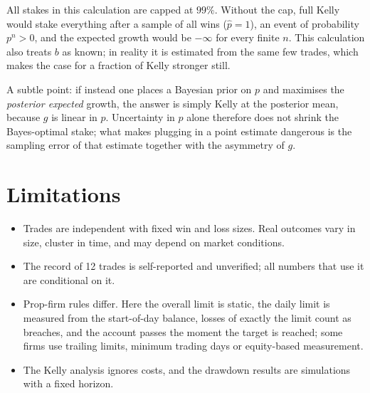 \documentclass[11pt,a4paper]{article}
\begin{document}
All stakes in this calculation are capped at $99\%$. Without the cap, full Kelly would
stake everything after a sample of all wins ($\hat p = 1$), an event of probability
$p^n > 0$, and the expected growth would be $-\infty$ for every finite $n$. This calculation also
treats $b$ as known; in reality it is estimated from the same few trades, which makes
the case for a fraction of Kelly stronger still.

A subtle point: if instead one places a Bayesian prior on $p$ and maximises the
\emph{posterior expected} growth, the answer is simply Kelly at the posterior mean,
because $g$ is linear in $p$. Uncertainty in $p$ alone therefore does not shrink the
Bayes-optimal stake; what makes plugging in a point estimate dangerous is the sampling
error of that estimate together with the asymmetry of $g$.

\section{Limitations}

\begin{itemize}
\item Trades are independent with fixed win and loss sizes. Real outcomes vary in size,
cluster in time, and may depend on market conditions.
\item The record of 12 trades is self-reported and unverified; all numbers that use it
are conditional on it.
\item Prop-firm rules differ. Here the overall limit is static, the daily limit is
measured from the start-of-day balance, losses of exactly the limit count as breaches,
and the account passes the moment the target is reached; some firms use trailing
limits, minimum trading days or equity-based measurement.
\item The Kelly analysis ignores costs, and the drawdown results are simulations with
a fixed horizon.
\end{itemize}
\end{document}
